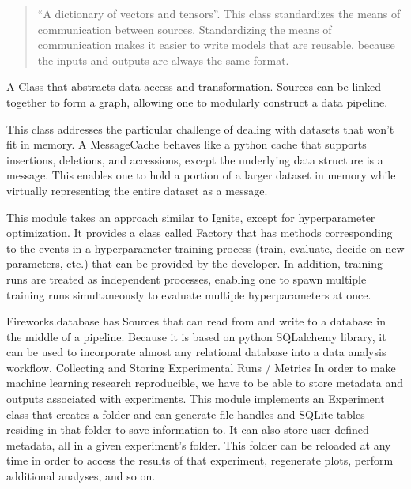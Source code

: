 \documentclass[letterpaper,10pt,english]{sphinxmanual}
\begin{document}
\begin{quote}

“A dictionary of vectors and tensors”. This class standardizes the means of communication between sources. Standardizing the means of communication makes it easier to write models that are reusable, because the inputs and outputs are always the same format.
\end{quote}


A Class that abstracts data access and transformation. Sources can be linked together to form a graph, allowing one to modularly construct a data pipeline.


This class addresses the particular challenge of dealing with datasets that won’t fit in memory. A MessageCache behaves like a python cache that supports insertions, deletions, and accessions, except the underlying data structure is a message. This enables one to hold a portion of a larger dataset in memory  while virtually representing the entire dataset as a message.


This module takes an approach similar to Ignite, except for hyperparameter optimization. It provides a class called Factory that has methods corresponding to the events in a hyperparameter training process (train, evaluate, decide on new parameters, etc.) that can be provided by the developer. In addition, training runs are treated as independent processes, enabling one to spawn multiple training runs simultaneously to evaluate multiple hyperparameters at once.


Fireworks.database has Sources that can read from and write to a database in the middle of a pipeline. Because it is based on python SQLalchemy library, it can be used to incorporate almost any relational database into a data analysis workflow.
Collecting and Storing Experimental Runs / Metrics
In order to make machine learning research reproducible, we have to be able to store metadata and outputs associated with experiments. This module implements an Experiment class that creates a folder and can generate file handles and SQLite tables residing in that folder to save information to. It can also store user defined metadata, all in a given experiment’s folder. This folder can be reloaded at any time in order to access the results of that experiment, regenerate plots, perform additional analyses, and so on.
\end{document}
